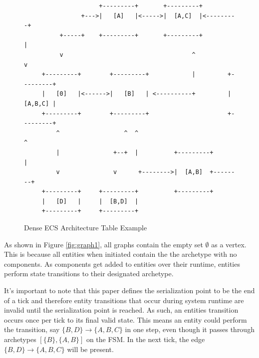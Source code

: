 \begin{figure}[htbp]
    \centering
    \begin{verbatim}                                                                      
                     +---------+       +---------+                                  
                +--->|   [A]   |<----->|  [A,C]  |<---------+                        
          +-----+    +---------+       +---------+          |                        
          v                                    ^            v                        
     +---------+        +---------+            |         +---------+                   
     |   [0]   |<------>|   [B]   | <----------+         | [A,B,C] |                   
     +---------+        +---------+                      +---------+                   
         ^                  ^  ^                             ^                        
         |               +--+  |          +---------+        |                        
         v               v      +-------->|  [A,B]  +--------+                        
     +---------+     +---------+          +---------+                                 
     |   [D]   |     |  [B,D]  |                                                       
     +---------+     +---------+                                                              
    \end{verbatim}
    \caption{Dense ECS Architecture Table Example}
\end{figure}
                                                         
                                                         


As shown in Figure \ref{fig:graph1}, all graphs contain the empty set $\emptyset$ as a vertex. This is because all entities when initiated contain the the archetype with no components. As components get added to entities over their runtime, entities perform state transitions to their designated archetype.

It's important to note that this paper defines the serialization point to be the end of a tick and therefore entity transitions that occur during system runtime are invalid until the serialization point is reached. As such, an entities transition occurs once per tick to its final valid state. This means an entity could perform the transition, say $\{B,D\} \rightarrow \{A,B,C\}$ in one step, even though it passes through archetypes $[\{B\}, \{A,B\}]$ on the FSM. In the next tick, the edge $\{B,D\} \rightarrow \{A,B,C\}$ will be present. 

